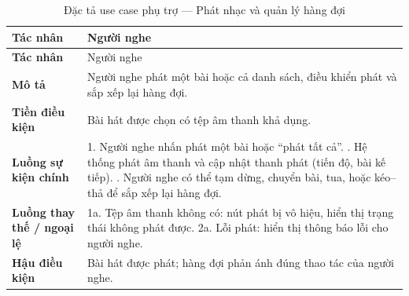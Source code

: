 \documentclass[../DoAn.tex]{subfiles}
\begin{document}
\begin{longtable}{|p{3.0cm}|p{11.0cm}|}
\caption{Đặc tả use case phụ trợ --- Phát nhạc và quản lý hàng đợi}\label{table:ucb2}\\
\hline
\textbf{Tác nhân} & Người nghe \\
\hline
\endfirsthead
\hline
\textbf{Tác nhân} & Người nghe \\
\hline
\endhead
\textbf{Mô tả} & Người nghe phát một bài hoặc cả danh sách, điều khiển phát và sắp xếp lại hàng đợi. \\ \hline
\textbf{Tiền điều kiện} & Bài hát được chọn có tệp âm thanh khả dụng. \\ \hline
\textbf{Luồng sự kiện chính} & 1. Người nghe nhấn phát một bài hoặc ``phát tất cả''. \newline 2. Hệ thống phát âm thanh và cập nhật thanh phát (tiến độ, bài kế tiếp). \newline 3. Người nghe có thể tạm dừng, chuyển bài, tua, hoặc kéo--thả để sắp xếp lại hàng đợi. \\ \hline
\textbf{Luồng thay thế / ngoại lệ} & 1a. Tệp âm thanh không có: nút phát bị vô hiệu, hiển thị trạng thái không phát được. \newline 2a. Lỗi phát: hiển thị thông báo lỗi cho người nghe. \\ \hline
\textbf{Hậu điều kiện} & Bài hát được phát; hàng đợi phản ánh đúng thao tác của người nghe. \\ \hline
\end{longtable}
\end{document}
